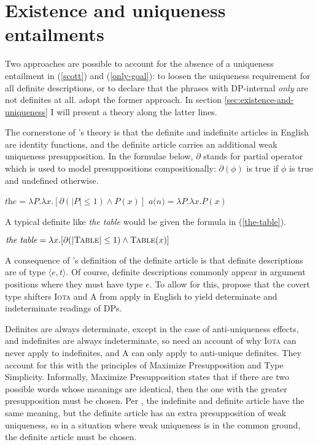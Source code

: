 \section{Existence and uniqueness entailments \label{sec:existence-and-uniqueness}}

Two approaches are possible to account for the absence of a uniqueness entailment in (\ref{scott}) and (\ref{only-goal}): to loosen the uniqueness requirement for all definite descriptions, or to declare that the phrases with DP-internal \textit{only} are not definites at all. \citeauthor{cb2015} adopt the former approach. In section \ref{sec:existence-and-uniqueness} I will present a theory along the latter lines.

The cornerstone of \citeauthor{cb2015}'s theory is that the definite and indefinite articles in English are identity functions, and the definite article carries an additional weak uniqueness presupposition. In the formulae below, $\partial$ stands for  partial operator which is used to model presuppositions compositionally: $\partial(\phi)$ is true if $\phi$ is true and undefined otherwise.

\begin{exe}
	\ex $\textit{the} = \lambda P . \lambda x . [\partial(|P| \le 1) \land P(x)]$
	\ex $\textit{a(n)} = \lambda P . \lambda x . P(x)$
\end{exe}

A typical definite like \textit{the table} would be given the formula in (\ref{the-table}).

\begin{exe}
	\ex \label{the-table} $\textit{the table} = \lambda x . [ \partial(|\textsc{Table}| \le 1) \land \textsc{Table}(x) ]$
\end{exe}

A consequence of \citeauthor{cb2015}'s definition of the definite article is that definite descriptions are of type $\langle e, t \rangle$. Of course, definite descriptions commonly appear in argument positions where they must have type $e$. To allow for this, \citeauthor{cb2015} propose that the covert type shifters \textsc{Iota} and \textsc{A} from \citet{partee86} apply in English to yield determinate and indeterminate readings of DPs.

Definites are always determinate, except in the case of anti-uniqueness effects, and indefinites are always indeterminate, so \citeauthor{cb2015} need an account of why \textsc{Iota} can never apply to indefinites, and \textsc{A} can only apply to anti-unique definites. They account for this with the principles of Maximize Presupposition and Type Simplicity. Informally, Maximize Presupposition states that if there are two possible words whose meanings are identical, then the one with the greater presupposition must be chosen. Per \citeauthor{cb2015}, the indefinite and definite article have the same meaning, but the definite article has an extra presupposition of weak uniqueness, so in a situation where weak uniqueness is in the common ground, the definite article must be chosen.

